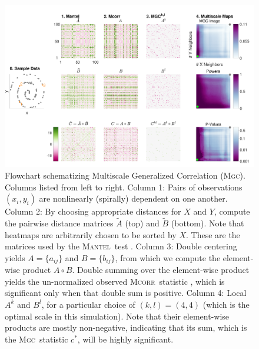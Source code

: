 \documentclass[11pt]{article}
\providecommand{\sct}[1]{{\normalfont\textsc{#1}}}
\newcommand{\G}{c}
\newcommand{\Mgc}{\sct{Mgc}}
\newcommand{\Mcorr}{\sct{Mcorr}}
\newcommand{\Mantel}{\sct{Mantel}}
\begin{document}
\begin{figure}[htbp]
\includegraphics[width=1.0\textwidth]{../Figures/FigA}
\caption{
Flowchart schematizing Multiscale Generalized Correlation (\Mgc). Columns listed from left to right.
Column 1: Pairs of observations $(x_i,y_i)$ are nonlinearly (spirally) dependent on one another.
Column 2: By choosing appropriate distances for $X$ and $Y$, compute the pairwise distance matrices $\tilde{A}$ (top) and $\tilde{B}$ (bottom).  
Note that heatmaps  are arbitrarily chosen to be sorted by $X$. These are the matrices used by the \Mantel~test \cite{Mantel1967}.
Column 3: Double centering yields $A=\{a_{ij}\}$ and $B=\{b_{ij}\}$, from which we compute the element-wise product $A \circ B$.  Double summing over the element-wise product yields the un-normalized observed \Mcorr~statistic \cite{SzekelyRizzo2013a}, which is significant only when that double sum is positive. 
Column 4: Local $A^{k}$ and $B^{l}$, for a particular choice of $(k,l)=(4,4)$ (which is the optimal scale in this simulation). Note that their element-wise products are mostly non-negative, indicating that its sum, which is the \Mgc~statistic $\G^*$, will be highly significant.
}
\end{figure}
\end{document}
